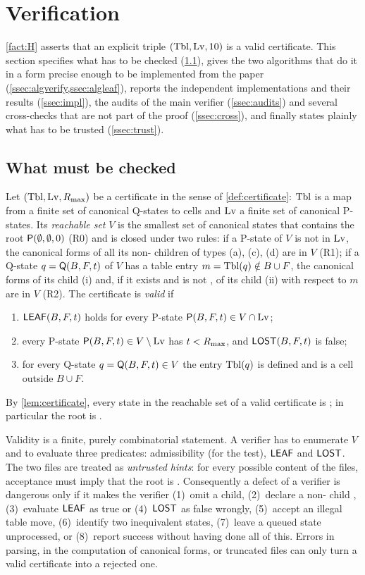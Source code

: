 \section{Verification}\label{sec:verification}


\cref{fact:H} asserts that an explicit triple $(\mathrm{Tbl},\mathrm{Lv},10)$ is a valid certificate. This
section specifies what has to be checked (\cref{ssec:what}), gives the two algorithms that do it in a form
precise enough to be implemented from the paper (\cref{ssec:algverify,ssec:algleaf}), reports the independent
implementations and their results (\cref{ssec:impl}), the audits of the main verifier (\cref{ssec:audits})
and several cross-checks that are not part of the proof (\cref{ssec:cross}), and finally states plainly what
has to be trusted (\cref{ssec:trust}).

\subsection{What must be checked}\label{ssec:what}

Let $(\mathrm{Tbl},\mathrm{Lv},R_{\max})$ be a certificate in the sense of \cref{def:certificate}: $\mathrm{Tbl}$ is a map from a
finite set of canonical Q-states to cells and $\mathrm{Lv}$ a finite set of canonical P-states. Its \emph{reachable
set} $V$ is the smallest set of canonical states that contains the root $\mathsf{P}(\emptyset,\emptyset,0)$ (R0)
and is closed under two rules: if a P-state of $V$ is not in $\mathrm{Lv}$, the canonical forms of all its
non-\VOID{} children of types (a), (c), (d) are in $V$ (R1); if a Q-state $q=\mathsf{Q}(B,F,t)$ of $V$ has a table
entry $m=\mathrm{Tbl}(q)\notin B\cup F$, the canonical forms of its child (i) and, if it exists and is not \VOID, of
its child (ii) with respect to $m$ are in $V$ (R2). The certificate is \emph{valid} if
\begin{enumerate}[label=(V\arabic*),leftmargin=3em]
\item $\mathsf{LEAF}(B,F,t)$ holds for every P-state $\mathsf{P}(B,F,t)\in V\cap\mathrm{Lv}$;
\item every P-state $\mathsf{P}(B,F,t)\in V\setminus\mathrm{Lv}$ has $t<R_{\max}$, and $\mathsf{LOST}(B,F,t)$ is false;
\item for every Q-state $q=\mathsf{Q}(B,F,t)\in V$ the entry $\mathrm{Tbl}(q)$ is defined and is a cell outside $B\cup F$.
\end{enumerate}
By \cref{lem:certificate}, every state in the reachable set of a valid certificate is \WON; in particular
the root is \WON.

Validity is a finite, purely combinatorial statement. A verifier has to enumerate $V$ and to evaluate
three predicates: admissibility (for the \VOID{} test), $\mathsf{LEAF}$ and $\mathsf{LOST}$. The two files are treated as
\emph{untrusted hints}: for every possible content of the files, acceptance must imply that the root is
\WON. Consequently a defect of a verifier is dangerous only if it makes the verifier (1)~omit a child,
(2)~declare a non-\VOID{} child \VOID, (3)~evaluate $\mathsf{LEAF}$ as true or (4)~$\mathsf{LOST}$ as false wrongly,
(5)~accept an illegal table move, (6)~identify two inequivalent states, (7)~leave a queued state
unprocessed, or (8)~report success without having done all of this. Errors in parsing, in the
computation of canonical forms, or truncated files can only turn a valid certificate into a rejected one.

